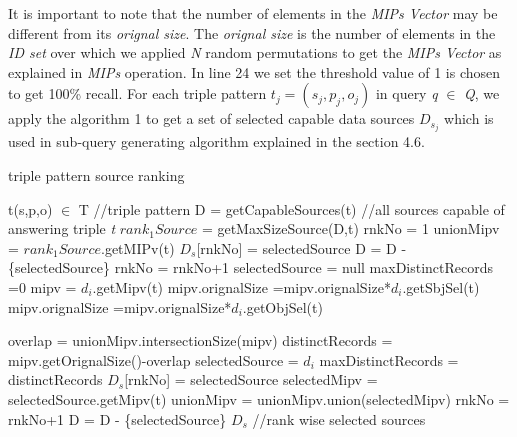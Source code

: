 \documentclass{sig-alternate}  %
\begin{document}
It is important to note that the number of elements in  the \emph{MIPs Vector} may be different from its \emph{orignal size}. The \emph{orignal size} is the number of elements in the \emph{ID set} over which we applied \emph{N} random permutations to get the \emph{MIPs Vector} as explained in \emph{MIPs} operation. In line 24 we set the threshold value of 1 is chosen to get 100\% recall. For each triple pattern $t_j = (s_j, p_j, o_j)$ in query \emph{q} $\in$ \emph{Q}, we apply the algorithm 1 to get a set of selected capable data sources \emph{$D_{s_j}$} which is used in sub-query generating algorithm explained in the section 4.6.

\begin{algorithm}
\caption{triple pattern source ranking}
\begin{algorithmic} [1]
\REQUIRE  t(s,p,o) $\in$ T  //triple pattern 
\STATE D = getCapableSources(t) //all sources capable of answering triple \emph{t}
\STATE $rank_1Source$ = getMaxSizeSource(D,t)
\STATE rnkNo = 1
\STATE unionMipv = $rank_1Source$.getMIPv(t) 
\STATE $D_{s}$[rnkNo] = selectedSource
\STATE D = D - \{selectedSource\}
\STATE rnkNo = rnkNo+1
\STATE selectedSource = null
\STATE maxDistinctRecords =0
\STATE mipv = $d_i$.getMipv(t)
\STATE mipv.orignalSize =mipv.orignalSize*$d_i$.getSbjSel(t)
\STATE mipv.orignalSize =mipv.orignalSize*$d_i$.getObjSel(t)
\ENDIF

\STATE overlap = unionMipv.intersectionSize(mipv)
\STATE distinctRecords = mipv.getOrignalSize()-overlap
\STATE selectedSource = $d_i$
\STATE maxDistinctRecords = distinctRecords
\ENDIF
\ENDFOR
{}
\STATE $D_{s}$[rnkNo] = selectedSource
\STATE selectedMipv = selectedSource.getMipv(t)
\STATE  unionMipv =  unionMipv.union(selectedMipv)
\STATE rnkNo = rnkNo+1
\ENDIF
\STATE D = D - \{selectedSource\}
\ENDWHILE
\RETURN $D_{s}$  //rank wise selected sources
\end{algorithmic}
\end{algorithm}
\end{document}
